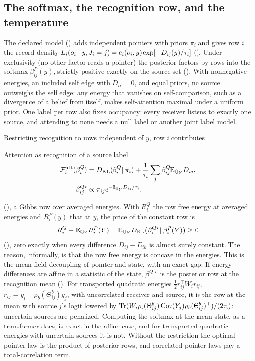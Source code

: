 \subsection{The softmax, the recognition row, and the temperature}
\label{comp:ch06-jensen}

The declared model () adds independent pointers with priors $\pi_i$ and gives row
$i$ the record density $L_i(o_i\mid y,J_i=j)=\mathrm c_i(o_i,y)\exp[-D_{ij}(y)/\tau_i]$
(). Under exclusivity (no other factor reads a pointer) the posterior factors by
rows into the softmax $\beta^P_{ij}(y)$, strictly positive exactly on the source set ().
With nonnegative energies, an included self edge with $D_{ii}=0$, and equal priors, no source outweighs the self
edge: any energy that vanishes on self-comparison, such as a divergence of a belief from itself, makes
self-attention maximal under a uniform prior. One label per row also fixes occupancy: every receiver listens to
exactly one source, and attending to none needs a null label or another joint label model.

Restricting recognition to rows independent of $y$, row $i$ contributes
\begin{keyequation}{Attention as recognition of a source label}
\[
\begin{aligned}
\mathcal F^{\rm att}_i(\beta^Q_i)&=D_{\mathrm{KL}}(\beta^Q_i\Vert\pi_i)+\frac1{\tau_i}\sum_j\beta^Q_{ij}\mathbb E_{\mathbb Q_Y}D_{ij},\\
\beta^{Q\star}_{ij}&\propto\pi_{ij}e^{-\mathbb E_{\mathbb Q_Y}D_{ij}/\tau_i}.
\end{aligned}
\]
\end{keyequation}
(), a Gibbs row over averaged energies. With $R^Q_i$ the row free energy at averaged
energies and $R^P_i(y)$ that at $y$, the price of the constant row is
\[
R^Q_i-\mathbb E_{\mathbb Q_Y}R^P_i(Y)=\mathbb E_{\mathbb Q_Y}D_{\mathrm{KL}}\bigl(\beta^{Q\star}_i\Vert\beta^P_i(Y)\bigr)\geq0
\]
(), zero exactly when every difference $D_{ij}-D_{ik}$ is almost surely
constant. The reason, informally, is that the row free energy is concave in the energies. This is the mean-field
decoupling of pointer and state, with an exact gap. If energy differences are affine in a statistic of the state,
$\beta^{Q\star}$ is the posterior row at the recognition mean (). For transported
quadratic energies $\tfrac12r_{ij}^\top W_ir_{ij}$, $r_{ij}=y_i-\rho_b(\Theta^b_{ij})y_j$, with uncorrelated receiver and
source, it is the row at the mean with source $j$'s logit lowered by
$\operatorname{Tr}(W_i\rho_b(\Theta^b_{ij})\operatorname{Cov}(Y_j)\rho_b(\Theta^b_{ij})^\top)/(2\tau_i)$: uncertain sources are
penalized. Computing the softmax at the mean state, as a transformer does, is exact in the affine case, and for transported
quadratic energies with uncertain sources it is not. Without
the restriction the optimal pointer law is the product of posterior rows, and correlated pointer laws pay a
total-correlation term.

